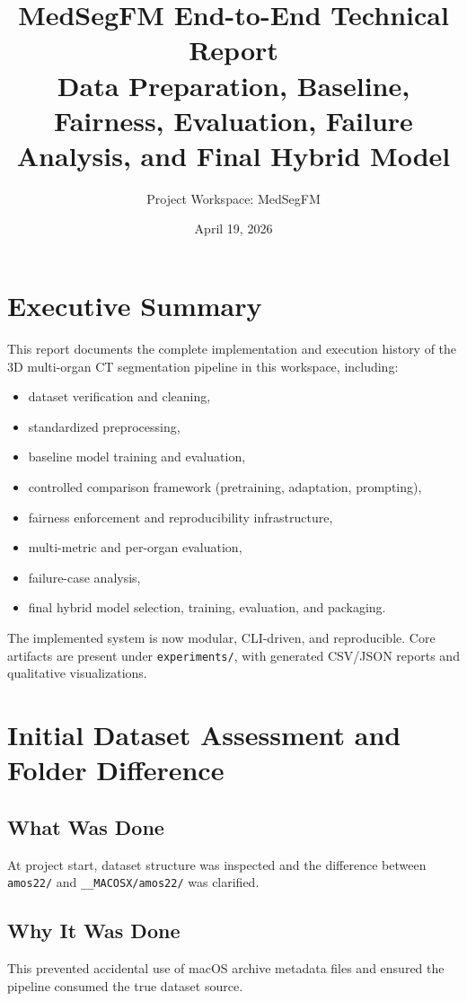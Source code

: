 \documentclass[11pt,a4paper]{article}
\title{MedSegFM End-to-End Technical Report\\Data Preparation, Baseline, Fairness, Evaluation, Failure Analysis, and Final Hybrid Model}
\author{Project Workspace: MedSegFM}
\date{April 19, 2026}
\begin{document}
\maketitle
\tableofcontents
\newpage

\section{Executive Summary}
This report documents the complete implementation and execution history of the 3D multi-organ CT segmentation pipeline in this workspace, including:
\begin{itemize}[leftmargin=1.5em]
  \item dataset verification and cleaning,
  \item standardized preprocessing,
  \item baseline model training and evaluation,
  \item controlled comparison framework (pretraining, adaptation, prompting),
  \item fairness enforcement and reproducibility infrastructure,
  \item multi-metric and per-organ evaluation,
  \item failure-case analysis,
  \item final hybrid model selection, training, evaluation, and packaging.
\end{itemize}

The implemented system is now modular, CLI-driven, and reproducible. Core artifacts are present under \texttt{experiments/}, with generated CSV/JSON reports and qualitative visualizations.

\section{Initial Dataset Assessment and Folder Difference}
\subsection{What Was Done}
At project start, dataset structure was inspected and the difference between \texttt{amos22/} and \texttt{\_\_MACOSX/amos22/} was clarified.

\subsection{Why It Was Done}
This prevented accidental use of macOS archive metadata files and ensured the pipeline consumed the true dataset source.
\end{document}

